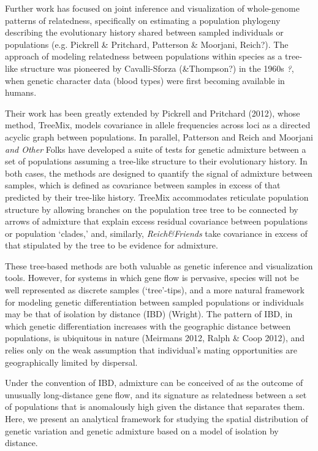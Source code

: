 \documentclass[12pt]{article}
\newcommand{\gb}[1]{{\em \color{magenta} #1}}
\begin{document}
Further work has focused on joint inference and visualization of whole-genome patterns of relatedness, specifically on estimating a population phylogeny describing the evolutionary history shared between sampled individuals or populations (e.g. Pickrell \& Pritchard, Patterson \& Moorjani, Reich?).  The approach of modeling relatedness between populations within species as a tree-like structure was pioneered by Cavalli-Sforza (\&Thompson?) in the 1960s \gb{?}, when genetic character data (blood types) were first becoming available in humans.  

Their work has been greatly extended by Pickrell and Pritchard (2012), whose method, TreeMix, models covariance in allele frequencies across loci as a directed acyclic graph between populations.  In parallel, Patterson and Reich and Moorjani \gb{and Other} Folks have developed a suite of tests for genetic admixture between a set of populations assuming a tree-like structure to their evolutionary history.
In both cases, the methods are designed to quantify the signal of admixture between samples, which is defined as covariance between samples in excess of that predicted by their tree-like history.  TreeMix accommodates reticulate population structure by allowing branches on the population tree tree to be connected by arrows of admixture that explain excess residual covariance between populations or population `clades,' and, similarly, \gb{Reich\&Friends} take covariance in excess of that stipulated by the tree to be evidence for admixture.

These tree-based methods are both valuable as genetic inference and visualization tools.  However, for systems in which gene flow is pervasive, species will not be well represented as discrete samples (`tree'-tips), and a more natural framework for modeling genetic differentiation between sampled populations or individuals may be that of isolation by distance (IBD) (Wright).  The pattern of IBD, in which genetic differentiation increases with the geographic distance between populations, is ubiquitous in nature (Meirmans 2012, Ralph \& Coop 2012), and relies only on the weak assumption that individual's mating opportunities are geographically limited by dispersal.

Under the convention of IBD, admixture can be conceived of as the outcome of unusually long-distance gene flow, and its signature as relatedness between a set of populations that is anomalously high given the distance that separates them.  Here, we present an analytical framework for studying the spatial distribution of genetic variation and genetic admixture based on a model of isolation by distance.
\end{document}
